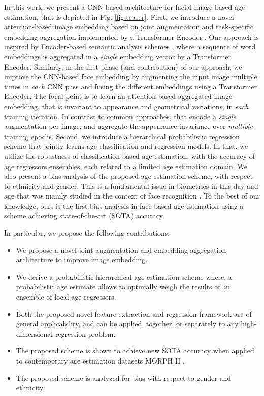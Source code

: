 \documentclass[10pt,twocolumn,letterpaper]{article}
\begin{document}
In this work, we present a CNN-based architecture for facial image-based age
estimation, that is depicted in Fig. \ref{fig:teaser}. First, we introduce
a novel attention-based image embedding based on joint augmentation and
task-specific embedding aggregation implemented by a Transformer Encoder
\cite{AttentionIsAllYouNeed}. Our approach is inspired by Encoder-based
semantic analysis schemes \cite{bert}, where a sequence of word embeddings
is aggregated in a \textit{single} embedding vector by a Transformer
Encoder. Similarly, in the first phase (and contribution) of our approach,
we improve the CNN-based face embedding by augmenting the input image
multiple times in \textit{each} CNN pass and fusing the different embeddings
using a Transformer Encoder. The focal point is to learn an attention-based
aggregated image embedding, that is invariant to appearance and geometrical
variations, in \textit{each} training iteration. In contrast to common
approaches, that encode a \textit{single} augmentation per image, and
aggregate the appearance invariance over \textit{multiple} training epochs.
Second, we introduce a hierarchical probabilistic regression scheme that
jointly learns age classification and regression models. In that, we utilize
the robustness of classification-based age estimation, with the accuracy of
age regressors ensembles, each related to a limited age estimation domain.
We also present a bias analysis of the proposed age estimation scheme, with
respect to ethnicity and gender. This is a fundamental issue in biometrics
in this day and age that was mainly studied in the context of face
recognition \cite{9209125,Gebru,9086771}. To the best of our knowledge, ours
is the first bias analysis in face-based age estimation using a scheme
achieving state-of-the-art (SOTA) accuracy.

In particular, we propose the following contributions:

\begin{itemize}
\item We propose a novel joint augmentation and embedding aggregation
architecture to improve image embedding.

\item We derive a probabilistic hierarchical age estimation scheme where, a
probabilistic age estimate allows to optimally weigh the results of an
ensemble of local age regressors.

\item Both the proposed novel feature extraction and regression framework
are of general applicability, and can be applied, together, or separately to
any high-dimensional regression problem.

\item The proposed scheme is shown to achieve new SOTA accuracy when applied
to contemporary age estimation datasets MORPH II \cite{1613043}.

\item The proposed scheme is analyzed for bias with respect to gender and
ethnicity.
\end{itemize}
\end{document}
